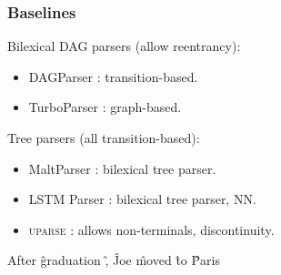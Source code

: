 \documentclass[t]{beamer}
\begin{document}
\begin{frame}
\frametitle{Baselines}
Bilexical DAG parsers (allow {\color{orange}reentrancy}):
\begin{itemize}
 \item DAGParser \cite{ribeyre-villemontedelaclergerie-seddah:2014:SemEval}:
 transition-based.
 \item TurboParser \cite{almeida-martins:2015:SemEval}:
 graph-based.
\end{itemize}

Tree parsers (all transition-based):
\begin{itemize}
 \item MaltParser \cite{nivre2007maltparser}: bilexical tree parser.
 \item LSTM Parser \cite{dyer2015transition}: bilexical tree parser, NN.
 \item \textsc{uparse} \cite{maier2015discontinuous}: allows {\color{blue}non-terminals}, {\color{red}discontinuity}.
\end{itemize}

\begin{center}
	\begin{dependency}
	\begin{deptext}[column sep=.7em,ampersand replacement=\^,font=\rmfamily]
	After \^ graduation \^ , \^ Joe \^ moved \^ to \^ Paris \\
	\end{deptext}
	\end{dependency}
\end{center}
\end{frame}
\end{document}
